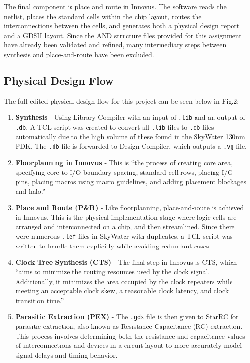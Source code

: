 \documentclass[conference]{IEEEtran}
\begin{document}
The final component is place and route in Innovus. The software reads the netlist, places the standard cells within the chip layout, routes the interconnections between the cells, and generates both a physical design report and a GDSII layout. Since the AND structure files provided for this assignment have already been validated and refined, many intermediary steps between synthesis and place-and-route have been excluded.

\subsection*{Physical Design Flow}

The full edited physical design flow for this project can be seen below in Fig.2:

\begin{enumerate}
    \item \textbf{Synthesis} - Using Library Compiler with an input of \texttt{.lib} and an output of \texttt{.db}. A TCL script was created to convert all \texttt{.lib} files to \texttt{.db} files automatically due to the high volume of these found in the SkyWater 130nm PDK. The \texttt{.db} file is forwarded to Design Compiler, which outputs a \texttt{.vg} file.
    
    \item \textbf{Floorplanning in Innovus} - This is “the process of creating core area, specifying core to I/O boundary spacing, standard cell rows, placing I/O pins, placing macros using macro guidelines, and adding placement blockages and halo.” \cite{b4}
    
    \item \textbf{Place and Route (P\&R)} - Like floorplanning, place-and-route is achieved in Innovus. This is the physical implementation stage where logic cells are arranged and interconnected on a chip, and then streamlined. Since there were numerous \texttt{.lef} files in SkyWater with duplicates, a TCL script was written to handle them explicitly while avoiding redundant cases.

    \item \textbf{Clock Tree Synthesis (CTS)} - The final step in Innovus is CTS, which “aims to minimize the routing resources used by the clock signal. Additionally, it minimizes the area occupied by the clock repeaters while meeting an acceptable clock skew, a reasonable clock latency, and clock transition time.” \cite{b5}
    
    \item \textbf{Parasitic Extraction (PEX)} - The \texttt{.gds} file is then given to StarRC for parasitic extraction, also known as Resistance-Capacitance (RC) extraction. This process involves determining both the resistance and capacitance values of interconnections and devices in a circuit layout to more accurately model signal delays and timing behavior.


\end{enumerate}
\end{document}
